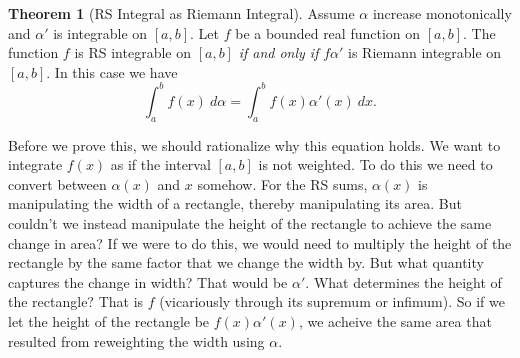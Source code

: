 \documentclass{article}
\theoremstyle{definition}
\newtheorem{theorem}{Theorem}[section]
\begin{document}
\begin{theorem}[RS Integral as Riemann Integral]
Assume $ \alpha $ increase monotonically and $ \alpha' $ is integrable on $ [a,b] $. Let $ f $ be a bounded real function on $ [a,b] $. The function $ f $ is RS integrable on $ [a,b] $ \textit{if and only if} $ f\alpha' $ is Riemann integrable on $ [a,b] $. In this case we have 
$$ \int_{a}^{b}f(x)\ d\alpha=\int_{a}^{b}f(x)\alpha'(x)\ dx .$$
\end{theorem} 
Before we prove this, we should rationalize why this equation holds. We want to integrate $ f(x) $ as if the interval $ [a,b] $ is not weighted. To do this we need to convert between $ \alpha(x) $ and $ x $ somehow. For the RS sums, $ \alpha(x) $ is manipulating the width of a rectangle, thereby manipulating its area. But couldn't we instead manipulate the height of the rectangle to achieve the same change in area? If we were to do this, we would need to multiply the height of the rectangle by the same factor that we change the width by. But what quantity captures the change in width? That would be $ \alpha' $. What determines the height of the rectangle? That is $ f $ (vicariously through its supremum or infimum). So if we let the height of the rectangle be $ f(x)\alpha'(x) $, we acheive the same area that resulted from reweighting the width using $ \alpha $.
\end{document}
